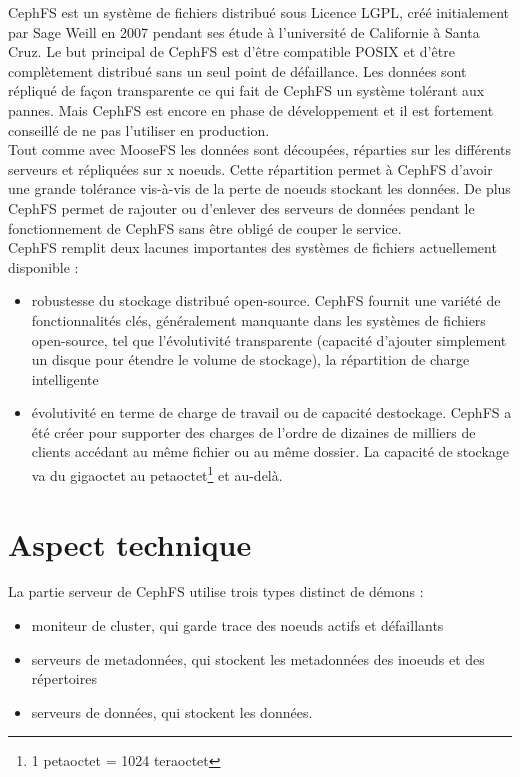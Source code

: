 \documentclass[12pt]{report}
\begin{document}
                        CephFS est un système de fichiers distribué sous Licence LGPL, créé initialement par Sage Weill en 2007 pendant ses étude à l'université de Californie à Santa Cruz. Le but principal de CephFS est d'être compatible POSIX et d'être complètement distribué sans un seul point de défaillance. Les données sont répliqué de façon transparente ce qui fait de CephFS un système tolérant aux pannes. Mais CephFS est encore en phase de développement et il est fortement conseillé de ne pas l'utiliser en production.\\

                        Tout comme avec MooseFS les données sont découpées, réparties sur les différents serveurs et répliquées sur x noeuds. Cette répartition permet à CephFS d'avoir une grande tolérance vis-à-vis de la perte de noeuds stockant les données. De plus CephFS permet de rajouter ou d'enlever des serveurs de données pendant le fonctionnement de CephFS sans être obligé de couper le service.\\

                        CephFS remplit deux lacunes importantes des systèmes de fichiers actuellement disponible :
                        \begin{itemize}
                          \item robustesse du stockage distribué open-source. CephFS fournit une variété de fonctionnalités clés, généralement manquante dans les systèmes de fichiers open-source, tel que l'évolutivité transparente (capacité d'ajouter simplement un disque pour étendre le volume de stockage), la répartition de charge intelligente
                          \item évolutivité en terme de charge de travail ou de capacité destockage. CephFS a été créer pour supporter des charges de l'ordre de dizaines de milliers de clients accédant au même fichier ou au même dossier. La capacité de stockage va du gigaoctet au petaoctet\footnote{1 petaoctet = 1024 teraoctet} et au-delà.
                        \end{itemize}
\newpage
                        
                \section{Aspect technique}
                        
                        La partie serveur de CephFS utilise trois types distinct de démons : 
                        \begin{itemize}
                        \item moniteur de cluster, qui garde trace des noeuds actifs et défaillants
                          \item serveurs de metadonnées, qui stockent les metadonnées des inoeuds et des répertoires
                          \item serveurs de données, qui stockent les données.
                        \end{itemize}
\end{document}
